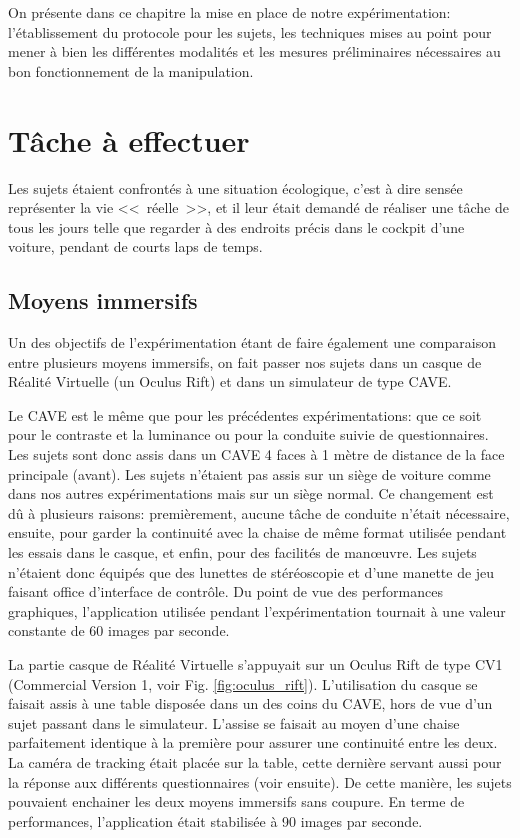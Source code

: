 	\par On présente dans ce chapitre la mise en place de notre expérimentation: l'établissement du protocole pour les sujets, les techniques mises au point pour mener à bien les différentes modalités et les mesures préliminaires nécessaires au bon fonctionnement de la manipulation.
	
	\section{Tâche à effectuer}
	\par Les sujets étaient confrontés à une situation écologique, c'est à dire sensée représenter la vie <<~réelle~>>, et il leur était demandé de réaliser une tâche de tous les jours telle que regarder à des endroits précis dans le cockpit d'une voiture, pendant de courts laps de temps.
	
	\subsection{Moyens immersifs}	
	\par Un des objectifs de l'expérimentation étant de faire également une comparaison entre plusieurs moyens immersifs,	on fait passer nos sujets dans un casque de Réalité Virtuelle (un Oculus Rift) et dans un simulateur de type CAVE.
	
	\par Le CAVE est le même que pour les précédentes expérimentations: que ce soit pour le contraste et la luminance ou pour la conduite suivie de questionnaires. Les sujets sont donc assis dans un CAVE 4 faces à 1 mètre de distance de la face principale (avant). Les sujets n'étaient pas assis sur un siège de voiture comme dans nos autres expérimentations mais sur un siège normal. Ce changement est dû à plusieurs raisons: premièrement, aucune tâche de conduite n'était nécessaire, ensuite, pour garder la continuité avec la chaise de même format utilisée pendant les essais dans le casque, et enfin,  pour des facilités de manœuvre. Les sujets n'étaient donc équipés que des lunettes de stéréoscopie et d'une manette de jeu faisant office d'interface de contrôle. Du point de vue des performances graphiques, l'application utilisée pendant l'expérimentation tournait à une valeur constante de 60 images par seconde.
	
	\par La partie casque de Réalité Virtuelle s'appuyait sur un Oculus Rift de type CV1 (Commercial Version 1, voir Fig. \ref{fig:oculus_rift}). L'utilisation du casque se faisait assis à une table disposée dans un des coins du CAVE, hors de vue d'un sujet passant dans le simulateur. L'assise se faisait au moyen d'une chaise parfaitement identique à la première pour assurer une continuité entre les deux. La caméra de tracking était placée sur la table, cette dernière servant aussi pour la réponse aux différents questionnaires (voir ensuite). De cette manière, les sujets pouvaient enchainer les deux moyens immersifs sans coupure. En terme de performances, l'application était stabilisée à 90 images par seconde.
	
